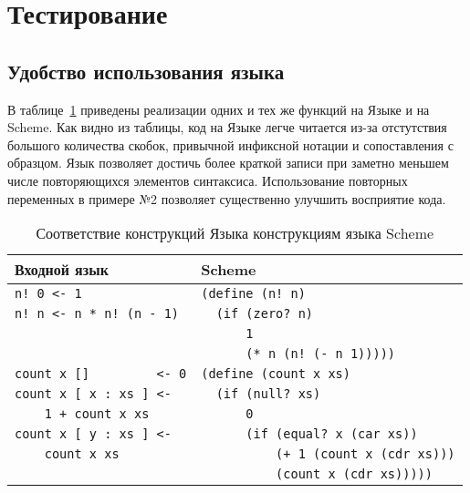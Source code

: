 \section{Тестирование}
    \subsection{Удобство использования языка}
    В таблице~\ref{tabular:code_scheme} приведены реализации одних и тех же функций на Языке и на Scheme.
    Как видно из таблицы, код на Языке легче читается из-за отстутствия большого количества скобок, привычной инфиксной нотации и сопоставления с образцом.
    Язык позволяет достичь более краткой записи при заметно меньшем числе повторяющихся элементов синтаксиса.
    Использование повторных переменных в примере №2 позволяет существенно улучшить восприятие кода.
    \begin{table}[ht!]
        \caption{Соответствие конструкций Языка конструкциям языка Scheme}
        \centering
        \label{tabular:code_scheme}
        \begin{tabular}{|l|l|}
            \hline
            \bf{Входной язык}            & \bf{Scheme} \\ \hline
            \verb,n! 0 <- 1,             & \verb,(define (n! n), \\
            \verb,n! n <- n * n! (n - 1),& \verb,  (if (zero? n),\\
                                         & \verb,      1, \\
                                         & \verb,      (* n (n! (- n 1))))), \\ \hline

            \verb,count x []         <- 0,     & \verb,(define (count x xs), \\
            \verb,count x [ x : xs ] <-,       & \verb,  (if (null? xs), \\
            \verb,    1 + count x xs,          & \verb,      0, \\
            \verb,count x [ y : xs ] <-,       & \verb,      (if (equal? x (car xs)), \\
            \verb,    count x xs,              & \verb,          (+ 1 (count x (cdr xs))), \\
                                               & \verb,          (count x (cdr xs))))), \\ \hline
            

\end{tabular}
\end{table}
